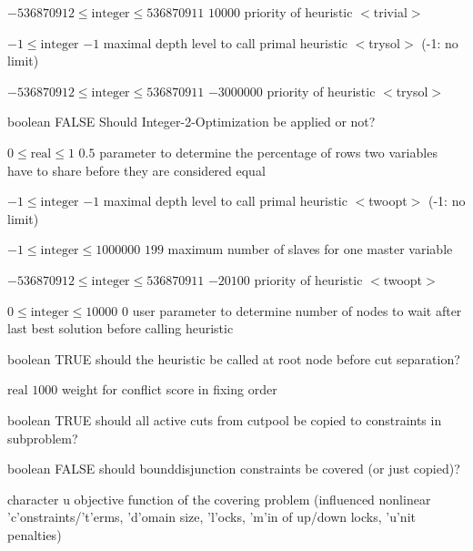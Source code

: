 %
{$-536870912\leq\textrm{integer}\leq536870911$}%
{$10000$}%
{priority of heuristic $<$trivial$>$}%
{}

%
{$-1\leq\textrm{integer}$}%
{$-1$}%
{maximal depth level to call primal heuristic $<$trysol$>$ (-1: no limit)}%
{}

%
{$-536870912\leq\textrm{integer}\leq536870911$}%
{$-3000000$}%
{priority of heuristic $<$trysol$>$}%
{}

%
{boolean}%
{FALSE}%
{ Should Integer-2-Optimization be applied or not?}%
{}

%
{$0\leq\textrm{real}\leq1$}%
{$0.5$}%
{parameter to determine the percentage of rows two variables have to share before they are considered equal}%
{}

%
{$-1\leq\textrm{integer}$}%
{$-1$}%
{maximal depth level to call primal heuristic $<$twoopt$>$ (-1: no limit)}%
{}

%
{$-1\leq\textrm{integer}\leq1000000$}%
{$199$}%
{maximum number of slaves for one master variable}%
{}

%
{$-536870912\leq\textrm{integer}\leq536870911$}%
{$-20100$}%
{priority of heuristic $<$twoopt$>$}%
{}

%
{$0\leq\textrm{integer}\leq10000$}%
{$0$}%
{user parameter to determine number of nodes to wait after last best solution before calling heuristic}%
{}

%
{boolean}%
{TRUE}%
{should the heuristic be called at root node before cut separation?}%
{}

%
{$\textrm{real}$}%
{$1000$}%
{weight for conflict score in fixing order}%
{}

%
{boolean}%
{TRUE}%
{should all active cuts from cutpool be copied to constraints in subproblem?}%
{}

%
{boolean}%
{FALSE}%
{should bounddisjunction constraints be covered (or just copied)?}%
{}

%
{character}%
{u}%
{objective function of the covering problem (influenced nonlinear 'c'onstraints/'t'erms, 'd'omain size, 'l'ocks, 'm'in of up/down locks, 'u'nit penalties)}%
{}

